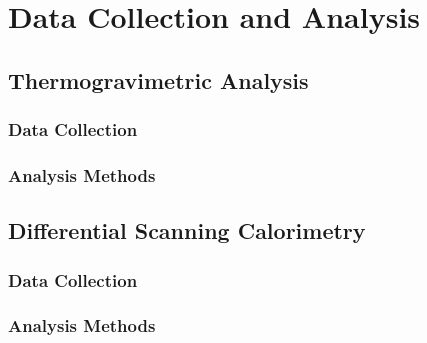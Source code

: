 \chapter{Data Collection and Analysis}
\label{ch:DataAnalysis}
\thispagestyle{empty}



\section{Thermogravimetric Analysis}
\label{chap:TGA-methods}




\subsection{Data Collection}



\subsection{Analysis Methods}



\section{Differential Scanning Calorimetry}
\label{chap:DSC-methods}





\subsection{Data Collection}



\subsection{Analysis Methods}


